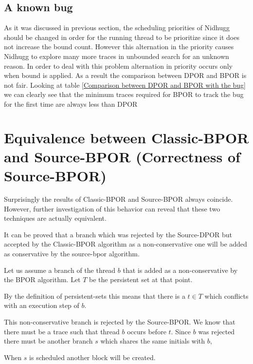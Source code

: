 \subsection{A known bug}
As it was discussed in previous section, the scheduling priorities of Nidhugg should be changed in order for the running thread to be prioritize since it does not
increase the bound count. However this alternation in the priority causes Nidhugg to explore many more traces in unbounded search for an unknown reason. In order to deal with
this problem alternation in priority occurs only when bound is applied. As a result the comparison between DPOR and BPOR is not fair. Looking at table \ref{Comparison between DPOR and BPOR with the bug}
we can clearly see that the minimum traces required for BPOR to track the bug for the first time are always less than DPOR


\section{Equivalence between Classic-BPOR and Source-BPOR (Correctness of Source-BPOR)}
Surprisingly the results of Classic-BPOR and Source-BPOR always coincide. However, further investigation of this behavior can reveal that these two techniques
are actually equivalent. 

It can be proved that a branch which was rejected by the Source-DPOR but accepted by the Classic-BPOR algorithm as a non-conservative one will be added as 
conservative by the source-bpor algorithm.

Let us assume a branch of the thread $b$ that is added as a non-conservative by the BPOR algorithm. Let $T$ be the persistent set at that point.

By the definition of persistent-sets this means that there is a $t \in T$ which
conflicts with an execution step of $b$. 

This non-conservative branch is rejected by the Source-BPOR. We know that there must be
 a trace such that thread $b$ occurs before $t$. Since $b$ was rejected there must be another branch $s$ which shares the same initials
  with $b$, 
  
When $s$ is scheduled another block will be created.
 

